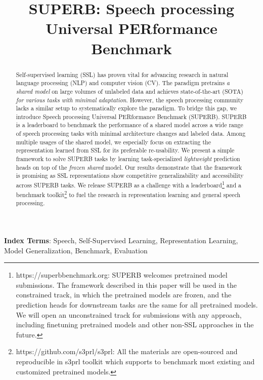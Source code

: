 \documentclass[a4paper]{article}
\title{SUPERB: Speech processing Universal PERformance Benchmark}
\begin{document}
\maketitle

\begin{abstract}
Self-supervised learning (SSL) has proven vital for advancing research in natural language processing (NLP) and computer vision (CV).
The paradigm pretrains \textit{a shared model} on large volumes of unlabeled data and achieves state-of-the-art (SOTA) \textit{for various tasks with minimal adaptation}.
However, the speech processing community lacks a similar setup to systematically explore the paradigm.
To bridge this gap, we introduce Speech processing Universal PERformance Benchmark (SUPERB).
SUPERB is a leaderboard to benchmark the performance of a shared model across a wide range of speech processing tasks with minimal architecture changes and labeled data.
Among multiple usages of the shared model, we especially focus on extracting the representation learned from SSL for its preferable re-usability.
We present a simple framework to solve SUPERB tasks by learning task-specialized \textit{lightweight} prediction heads on top of the \textit{frozen shared} model.
Our results demonstrate that the framework is promising as SSL representations show competitive generalizability and accessibility across SUPERB tasks.
We release SUPERB as a challenge with a leaderboard\footnote{\label{leaderboard}https://superbbenchmark.org: SUPERB welcomes pretrained model submissions. The framework described in this paper will be used in the constrained track, in which the pretrained models are frozen, and the prediction heads for downstream tasks are the same for all pretrained models. We will open an unconstrained track for submissions with any approach, including finetuning pretrained models and other non-SSL approaches in the future.} and a benchmark toolkit\footnote{\label{toolkit}https://github.com/s3prl/s3prl: All the materials are open-sourced and reproducible in s3prl toolkit which supports to benchmark most existing and customized pretrained models.} to fuel the research in representation learning and general speech processing.
\end{abstract}

\noindent\textbf{Index Terms}: Speech, Self-Supervised Learning, Representation Learning, Model Generalization, Benchmark, Evaluation
\end{document}
